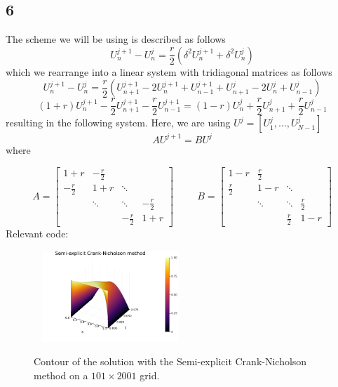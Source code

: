 \documentclass{article}
\numberwithin{equation}{section}
\theoremstyle{definition}
\begin{document}
\subsection{6}
The scheme we will be using is described as follows
\begin{equation}
    U_n^{j+1}-U_n^j = \frac r2 (\delta^2 U_n^{j+1} + \delta^2 U_n^j)
\end{equation}
which we rearrange into a linear system with tridiagonal matrices as follows
\begin{equation}
    U_n^{j+1}-U_n^j = \frac r2 \left(U_{n+1}^{j+1} -2U_{n}^{j+1} + U_{n-1}^{j+1} + U_{n+1}^{j} -2U_{n}^{j} + U_{n-1}^{j}\right)
\end{equation}
\begin{equation}
    \left(1+r\right)U_{n}^{j+1}-\frac{r}{2}U_{n+1}^{j+1}-\frac{r}{2}U_{n-1}^{j+1}=\left(1-r\right)U_{n}^{j}+\frac{r}{2}U_{n+1}^{j}+\frac{r}{2}U_{n-1}^{j}
\end{equation}
resulting in the following system. Here, we are using $U^j = [U_1^j, \dots, U_{N-1}^j]$
\begin{equation}
    AU^{j+1} = BU^j 
\end{equation}
where

\begin{equation}
    A = \begin{bmatrix}
        1+r & -\frac r2 &  & \\ 
        -\frac r2 & 1+r & \ddots & \\ 
         & \ddots & \ddots & -\frac r2\\ 
         &  & -\frac r2 & 1+r
        \end{bmatrix}
        \hspace{1cm}
        B = \begin{bmatrix}
        1-r & \frac r2 &  & \\ 
        \frac r2 & 1-r & \ddots & \\ 
         & \ddots & \ddots & \frac r2\\ 
         &  & \frac r2 & 1-r
        \end{bmatrix}
\end{equation}
Relevant code: 

\begin{figure}[H]\
    \centering
    \includegraphics[width=0.46\textwidth]{qA6.png}
    \caption{Contour of the solution with the Semi-explicit Crank-Nicholson method on a $101 \times 2001$ grid.}
    \label{fig:afig_se}
\end{figure}
\end{document}
